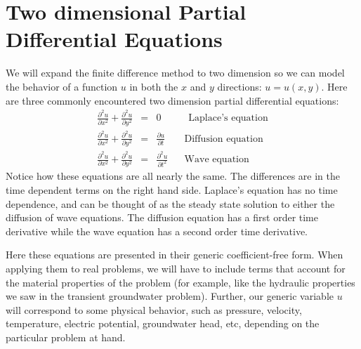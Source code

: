 \documentclass[11pt, oneside]{article}   	%
\begin{document}
\section*{Two dimensional Partial Differential Equations}
We will expand the finite difference method to two dimension so we can model the behavior of a function $u$ in both the $x$ and $y$ directions: $u = u(x,y)$.  Here are three commonly encountered two dimension partial differential equations:
\begin{eqnarray}
	\frac{\partial^2 u}{\partial x^2}   + \frac{\partial^2 u}{\partial y^2}&=&   0 \;\;\;\;\;\;\;\;\;\; \textrm{Laplace's equation} \\
 	  \frac{\partial^2 u}{\partial x^2}   + \frac{\partial^2 u}{\partial y^2}&=&  \frac{\partial u}{\partial t} \;\;\; \;\;\;\; \textrm{Diffusion equation} \\
	   \frac{\partial^2 u}{\partial x^2}   + \frac{\partial^2 u}{\partial y^2}&=&  \frac{\partial^2 u}{\partial t^2}  \;\;\;\;\;\; \textrm{Wave equation} 
\end{eqnarray}
 Notice how these equations are all nearly the same. The differences are in the time dependent terms on the right hand side. Laplace's equation has no time dependence, and can be thought of as the steady state solution to either the diffusion of wave equations. The diffusion equation has a first order time derivative while the wave equation has a second order time derivative.
 
 Here these equations are presented in their generic coefficient-free form. When applying them to real problems, we will have to include terms that account for the material properties of the problem (for example, like the hydraulic properties we saw in the transient groundwater problem). Further, our generic variable $u$ will correspond to some physical behavior, such as pressure, velocity, temperature, electric potential,  groundwater head, etc, depending on the particular problem at hand.

\end{document}
